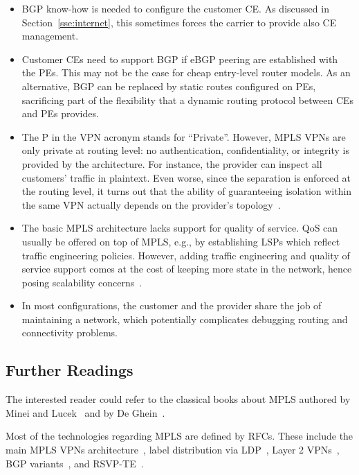 \documentclass{article}
\begin{document}
\begin{itemize}

 \item BGP know-how is needed to configure the customer CE. As discussed in Section~\ref{sse:internet}, this sometimes forces the carrier to provide also CE management. 

 \item Customer CEs need to support BGP if eBGP peering are established with the PEs. This may not be the case for cheap entry-level router models. As an alternative, BGP can be replaced by static routes configured on PEs, sacrificing part of the flexibility that a dynamic routing protocol between CEs and PEs provides.

 \item The P in the VPN acronym stands for ``Private''. However, MPLS VPNs are only private at routing level: no authentication, confidentiality, or integrity is provided by the architecture. For instance, the provider can inspect all customers' traffic in plaintext. Even worse, since the separation is enforced at the routing level, it turns out that the ability of guaranteeing isolation within the same VPN actually depends on the provider's topology~\cite{integrity}.

 \item The basic MPLS architecture lacks support for quality of service. QoS can usually be offered on top of MPLS, e.g., by establishing LSPs which reflect traffic engineering policies. However, adding traffic engineering and quality of service support comes at the cost of keeping more state in the network, hence posing scalability concerns~\cite{juniper-preso,rfc5439}.

 \item In most configurations, the customer and the provider share the job of maintaining a network, which potentially complicates debugging routing and connectivity problems.

\end{itemize}


\subsection{Further Readings}\label{sec:further-readings}

The interested reader could refer to the classical books about MPLS authored by Minei and Lucek~\cite{minei-lucek} and by De Ghein~\cite{de-ghein}.

Most of the technologies regarding MPLS are defined by RFCs. These include the main MPLS VPNs architecture~\cite{rfc3031,rfc4110}, label distribution via LDP~\cite{rfc5036}, Layer 2 VPNs~\cite{rfc4664}, BGP variants~\cite{rfc2858,rfc4364,rfc5512}, and RSVP-TE~\cite{rfc3209}.
\end{document}
